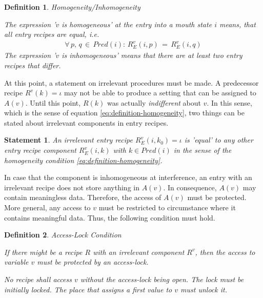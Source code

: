 \documentclass[12pt,a4paper]{scrartcl}
\newtheorem{definition}{Definition}
\newtheorem{statement}{Statement}
\begin{document}
\begin{definition} Homogeneity/Inhomogeneity

    The expression '$v$ is homogeneous' at the entry into a mouth state $i$
    means, that all entry recipes are equal, i.e.
    \begin{equation} \label{eq:definition-homogeneity}
        \begin{aligned}
        \forall\,p,\,q\,\in\,Pred(i):\,R_E^v(i,p)\,=\,R_E^v(i,q) 
        \end{aligned}
    \end{equation}
    The expression '$v$ is inhomogeneous' means that there are at least two
    entry recipes that differ.
\end{definition}

At this point, a statement on irrelevant procedures must be made. A predecessor
recipe $R^v(k)=\iota$ may not be able to produce a setting that can be assigned
to $A(v)$. Until this point, $R(k)$ was actually \textit{indifferent} about
$v$. In this sense, which is the sense of equation
\eqref{eq:definition-homogeneity}, two things can be stated about irrelevant
components in entry recipes.

\begin{statement}

    An irrelevant entry recipe $R^v_E(i, k_0)=\iota$ is 'equal' to any other 
    entry recipe component $R^v_E(i, k)$ with $k \in Pred(i)$ in the sense
    of the homogeneity condition \eqref{eq:definition-homogeneity}.
    
\end{statement}

In case that the component is inhomogeneous at interference, an entry with an
irrelevant recipe does not store anything in $A(v)$. In consequence, $A(v)$ may
contain meaningless data. Therefore, the access of $A(v)$ must be protected. More
general, any access to $v$ must be restricted to circumstance where it contains
meaningful data. Thus, the following condition must hold.

\begin{definition} Access-Lock Condition \label{cond:access-lock}

   If there might be a recipe $R$ with an irrelevant component $R^v$, then the
   access to variable $v$ must be protected by an access-lock. 
   
   No recipe shall access $v$ without the access-lock being open. The lock must
   be initially locked. The place that assigns a first value to $v$ must unlock
   it.
    
\end{definition}
\end{document}
